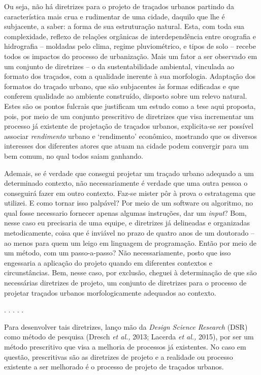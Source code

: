 \documentclass[]{report}
\begin{document}
	Ou seja, não há diretrizes para o projeto de traçados urbanos partindo da característica mais crua e rudimentar de uma cidade, daquilo que lhe é subjacente, a saber: a forma de sua estruturação natural. Esta, com toda sua complexidade, reflexo de relações orgânicas de interdependência entre orografia e hidrografia – moldadas pelo clima, regime pluviométrico, e tipos de solo – recebe todos os impactos do processo de urbanização. Mais um fator a ser observado em um conjunto de diretrizes – o da sustentabilidade ambiental, vinculada ao formato dos traçados, com a qualidade inerente à sua morfologia. Adaptação dos formatos do traçado urbano, que são subjacentes às formas edificadas e que conferem qualidade ao ambiente construído, disposto sobre um relevo natural. Estes são os pontos fulcrais que justificam um estudo como a tese aqui proposta, pois, por meio de um conjunto prescritivo de diretrizes que visa incrementar um processo já existente de projetação de traçados urbanos, explicita-se ser possível associar \textit{rendimento} urbano e ‘rendimento’ econômico, mostrando que os diversos interesses dos diferentes atores que atuam na cidade podem convergir para um bem comum, no qual todos saiam ganhando.

	Ademais, se é verdade que consegui projetar um traçado urbano adequado a um determinado contexto, não necessariamente é verdade que uma outra pessoa o conseguirá fazer em outro contexto. Faz-se mister pôr à prova o estratagema que utilizei. E como tornar isso palpável? Por meio de um software ou algoritmo, no qual fosse necessario fornecer apenas algumas instruções, dar um \textit{input}? Bom, nesse caso eu precisaria de uma equipe, e diretrizes já delineadas e organizadas metodicamente, coisa que é inviável no prazo de quatro anos de um doutorado – ao menos para quem um leigo em linguagem de programação. Então por meio de um método, com um passo-a-passo? Não necessariamente, posto que isso engessaria a aplicação do projeto quando em diferentes contextos e circunstâncias. Bem, nesse caso, por exclusão, cheguei à determinação de que são necessárias diretrizes de projeto, um conjunto de diretrizes para o processo de projetar traçados urbanos morfologicamente adequados ao contexto.

	\begin{center}
		. . . . .
	\end{center}

	Para desenvolver tais diretrizes, lanço mão da \textit{Design Science Research} (DSR) como método de pesquisa (Dresch \textit{et al.,} 2013; Lacerda \textit{et al.,} 2015), por ser um método prescritivo que visa a melhoria de processos já existentes. No caso em questão, prescritivas são as diretrizes de projeto e a realidade ou processo existente a ser melhorado é o processo de projeto de traçados urbanos. 
	
\end{document}
